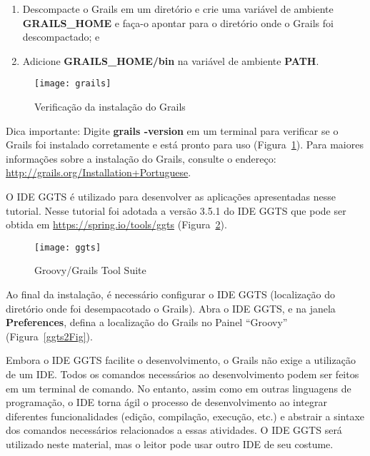{\begin{enumerate}
  \item Descompacte  o Grails em  um diretório e  crie uma variável  de ambiente
    {\bf  GRAILS\_HOME} e  faça-o apontar  para o  diretório onde  o  Grails foi
    descompactado; e

\vspace{0.3cm}
  
  \item Adicione {\bf GRAILS\_HOME/bin} na variável de ambiente {\bf PATH}.

\end{enumerate}

\vspace{0.5cm}

\begin{figure}[htbp]
\centering\texttt{[image: grails]}
\caption{Verificação da instalação do Grails}
\label{grailsFig}
\end{figure}

Dica importante: Digite {\bf grails -version} em um terminal para verificar se o
Grails    foi    instalado    corretamente    e    está    pronto    para    uso
(Figura~\ref{grailsFig}). Para maiores informações sobre a instalação do Grails,
consulte                               o                               endereço:
{\footnotesize\url{http://grails.org/Installation+Portuguese}}.  

  O IDE GGTS é
utilizado  para desenvolver  as aplicações  apresentadas nesse  tutorial.  Nesse
tutorial  foi  adotada a  versão  3.5.1  do IDE  GGTS  que  pode  ser obtida  em
{\footnotesize\url{https://spring.io/tools/ggts}} (Figura~\ref{ggtsFig}).  

\vspace{0.5cm}

\begin{figure}[htbp]
\centering\texttt{[image: ggts]}
\caption{Groovy/Grails Tool Suite}
\label{ggtsFig}
\end{figure}

\newpage

Ao  final da  instalação, é  necessário configurar  o IDE  GGTS  (localização do
diretório onde  foi desempacotado o Grails). Abra  o IDE GGTS, e  na janela {\bf
  Preferences}, defina a localização do Grails no Painel ``Groovy''
(Figura~\ref{ggts2Fig}). 

Embora o IDE GGTS facilite o desenvolvimento, o Grails não exige a utilização de
um IDE. Todos os comandos necessários  ao desenvolvimento podem ser feitos em um
terminal de comando. No entanto, assim como em outras linguagens de programação,
o  IDE  torna  ágil  o   processo  de  desenvolvimento  ao  integrar  diferentes
funcionalidades (edição,  compilação, execução, etc.)  e abstrair  a sintaxe dos
 comandos necessários relacionados a essas atividades. O IDE GGTS será utilizado
 neste material, mas o leitor pode usar outro IDE de seu costume.

}
